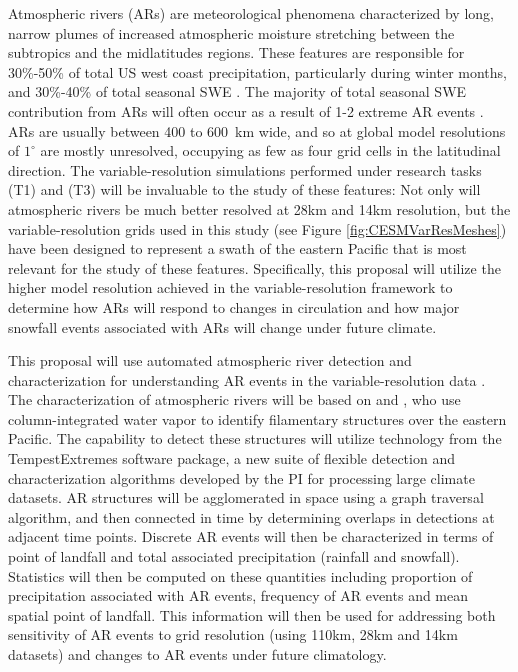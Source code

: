 \documentclass[11pt]{article}
\begin{document}
Atmospheric rivers (ARs) are meteorological phenomena characterized by long, narrow plumes of increased atmospheric moisture stretching between the subtropics and the midlatitudes regions.  These features are responsible for 30\%-50\% of total US west coast precipitation, particularly during winter months, and 30\%-40\% of total seasonal SWE \citep{dettinger2011atmospheric}.  The majority of total seasonal SWE contribution from ARs will often occur as a result of 1-2 extreme AR events \citep{guan2010extreme}.  ARs are usually between 400 to 600\ km wide, and so at global model resolutions of $1^\circ$ are mostly unresolved, occupying as few as four grid cells in the latitudinal direction.  The variable-resolution simulations performed under research tasks (T1) and (T3) will be invaluable to the study of these features: Not only will atmospheric rivers be much better resolved at 28km and 14km resolution, but the variable-resolution grids used in this study (see Figure \ref{fig:CESMVarResMeshes}) have been designed to represent a swath of the eastern Pacific that is most relevant for the study of these features.  Specifically, this proposal will utilize the higher model resolution achieved in the variable-resolution framework to determine how ARs will respond to changes in circulation and how major snowfall events associated with ARs will change under future climate.

This proposal will use automated atmospheric river detection and characterization for understanding AR events in the variable-resolution data \citep{ralph2004satellite, lavers2012detection}.  The characterization of atmospheric rivers will be based on \cite{neiman2008meteorological} and \cite{guan2010extreme}, who use column-integrated water vapor to identify filamentary structures over the eastern Pacific.  The capability to detect these structures will utilize technology from the TempestExtremes software package, a new suite of flexible detection and characterization algorithms developed by the PI for processing large climate datasets.  AR structures will be agglomerated in space using a graph traversal algorithm, and then connected in time by determining overlaps in detections at adjacent time points.  Discrete AR events will then be characterized in terms of point of landfall and total associated precipitation (rainfall and snowfall).  Statistics will then be computed on these quantities including proportion of precipitation associated with AR events, frequency of AR events and mean spatial point of landfall.  This information will then be used for addressing both sensitivity of AR events to grid resolution (using 110km, 28km and 14km datasets) and changes to AR events under future climatology.
\end{document}
